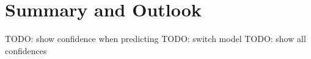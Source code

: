 \section{Summary and Outlook}


TODO: show confidence when predicting
TODO: switch model
TODO: show all confidences